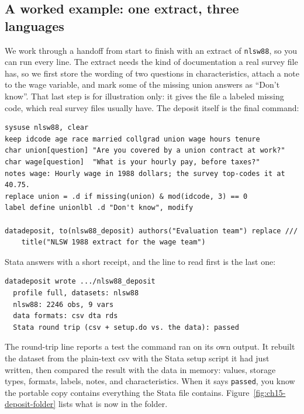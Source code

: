 \subsection{A worked example: one extract, three languages}\label{sec:deposit-example}
We work through a handoff from start to finish with an extract of \texttt{nlsw88}, so you can run every line. The extract needs the kind of documentation a real survey file has, so we first store the wording of two questions in characteristics, attach a note to the wage variable, and mark some of the missing union answers as \enquote{Don't know}. That last step is for illustration only: it gives the file a labeled missing code, which real survey files usually have. The deposit itself is the final command:
\par
{\footnotesize
\begin{verbatim}
sysuse nlsw88, clear
keep idcode age race married collgrad union wage hours tenure
char union[question] "Are you covered by a union contract at work?"
char wage[question]  "What is your hourly pay, before taxes?"
notes wage: Hourly wage in 1988 dollars; the survey top-codes it at 40.75.
replace union = .d if missing(union) & mod(idcode, 3) == 0
label define unionlbl .d "Don't know", modify

datadeposit, to(nlsw88_deposit) authors("Evaluation team") replace ///
    title("NLSW 1988 extract for the wage team")
\end{verbatim}
}
Stata answers with a short receipt, and the line to read first is the last one:
\par
{\footnotesize
\begin{verbatim}
datadeposit wrote .../nlsw88_deposit
  profile full, datasets: nlsw88
  nlsw88: 2246 obs, 9 vars
  data formats: csv dta rds
  Stata round trip (csv + setup.do vs. the data): passed
\end{verbatim}
}
The round-trip line reports a test the command ran on its own output. It rebuilt the dataset from the plain-text csv with the Stata setup script it had just written, then compared the result with the data in memory: values, storage types, formats, labels, notes, and characteristics. When it says \texttt{passed}, you know the portable copy contains everything the Stata file contains. Figure~\ref{fig:ch15-deposit-folder} lists what is now in the folder.


